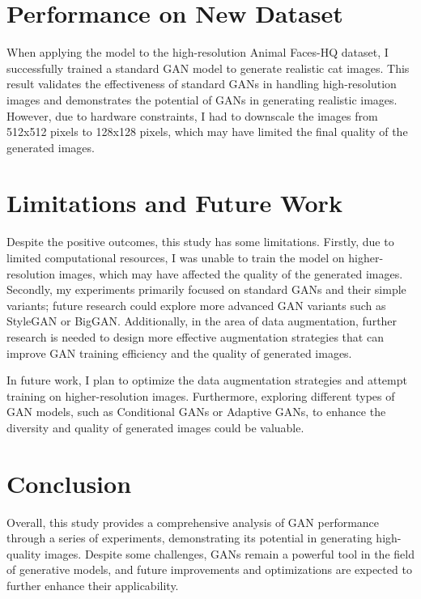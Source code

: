 \section{Performance on New Dataset}

When applying the model to the high-resolution Animal Faces-HQ dataset, I successfully trained a standard GAN model to generate realistic cat images. This result validates the effectiveness of standard GANs in handling high-resolution images and demonstrates the potential of GANs in generating realistic images. However, due to hardware constraints, I had to downscale the images from 512x512 pixels to 128x128 pixels, which may have limited the final quality of the generated images.

\section{Limitations and Future Work}

Despite the positive outcomes, this study has some limitations. Firstly, due to limited computational resources, I was unable to train the model on higher-resolution images, which may have affected the quality of the generated images. Secondly, my experiments primarily focused on standard GANs and their simple variants; future research could explore more advanced GAN variants such as StyleGAN or BigGAN. Additionally, in the area of data augmentation, further research is needed to design more effective augmentation strategies that can improve GAN training efficiency and the quality of generated images.

In future work, I plan to optimize the data augmentation strategies and attempt training on higher-resolution images. Furthermore, exploring different types of GAN models, such as Conditional GANs or Adaptive GANs, to enhance the diversity and quality of generated images could be valuable.

\section{Conclusion}

Overall, this study provides a comprehensive analysis of GAN performance through a series of experiments, demonstrating its potential in generating high-quality images. Despite some challenges, GANs remain a powerful tool in the field of generative models, and future improvements and optimizations are expected to further enhance their applicability.